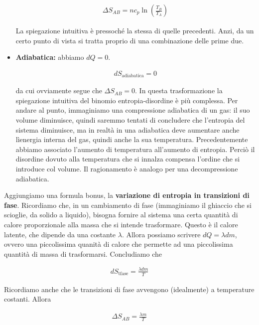 \begin{itemize}
    \begin{align}
        \Delta S_{AB} = nc_p\ln\left(\frac{T_B}{T_A}\right)
    \end{align}

    \noindent La spiegazione intuitiva è pressoché la stessa di
    quelle precedenti. Anzi, da un certo punto di vista si tratta
    proprio di una combinazione delle prime due.

    \item \textbf{Adiabatica:} abbiamo $dQ = 0$.
    
    \begin{align}
        dS_\text{adiabatica} = 0
    \end{align}

    \noindent da cui ovviamente segue che $\Delta S_{AB} = 0$.
    In questa trasformazione la spiegazione intuitiva del
    binomio entropia-disordine è più complessa. Per andare al punto,
    immaginiamo una compressione adiabatica di un gas: il suo
    volume diminuisce, quindi saremmo tentati di concludere che
    l'entropia del sistema diminuisce, ma in realtà in una adiabatica
    deve aumentare anche lìenergia interna del gas, quindi anche la
    sua temperatura. Precedentemente abbiamo associato l'aumento di
    temperatura all'aumento di entropia. Perciò il disordine dovuto
    alla temperatura che si innalza compensa l'ordine che si introduce
    col volume. Il ragionamento è analogo per una decompressione
    adiabatica.
\end{itemize}

\noindent Aggiungiamo una formula bonus, la \textbf{variazione di
entropia in transizioni di fase}. Ricordiamo che, in un cambiamento
di fase (immaginiamo il ghiaccio che si scioglie, da solido a liquido),
bisogna fornire al sistema una certa quantità di calore proporzionale
alla massa che si intende trasformare. Questo è il calore latente,
che dipende da una costante $\lambda$. Allora possiamo scrivere
$dQ = \lambda dm$, ovvero una piccolissima quanità di calore che
permette ad una piccolissima quantità di massa di trasformarsi.
Concludiamo che

\begin{align}
    dS_\text{tfase} = \frac{\lambda dm}{T}
\end{align}

\noindent Ricordiamo anche che le transizioni di fase avvengono
(idealmente) a temperature costanti. Allora

\begin{align}
    \Delta S_{AB} = \frac{\lambda m}{T}
\end{align}


